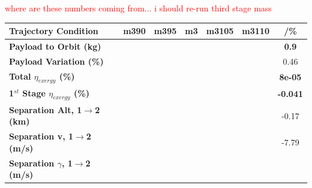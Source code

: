 \textcolor{red}{where are these numbers coming from... i should re-run third stage mass}
\begin{table}[ht]
	\centering
	\begin{tabular}{l c c c c c c} 
		\hline \textbf{Trajectory Condition}
		&m390
		&m395
		&m3
		&m3105
		&m3110
		& /\%
		\\
		\hline \textbf{Payload to Orbit (kg)}
		& \textbf{\PayloadToOrbitmThreeNinetyNoReturn}
		& \textbf{\PayloadToOrbitmThreeNinetyFiveNoReturn}
		& \textbf{\PayloadToOrbitmThreeStandardNoReturn}
		& \textbf{\PayloadToOrbitmThreeOneHundredFiveNoReturn}
		& \textbf{\PayloadToOrbitmThreeOneHundredTenNoReturn}
		&\textbf{0.9}
		\\
		\textbf{Payload Variation (\%)}
		& \PayloadVarmThreeNinetyNoReturn
		& \PayloadVarmThreeNinetyFiveNoReturn
		& \PayloadVarmThreeStandardNoReturn
		& \PayloadVarmThreeOneHundredFiveNoReturn
		& \PayloadVarmThreeOneHundredTenNoReturn
		&0.46
		\\
		\textbf{Total $\eta_{exergy}$ (\%)}
		& \textbf{\totalExergyEffmThreeNinetyNoReturn}
		& \textbf{\totalExergyEffmThreeNinetyFiveNoReturn}
		& \textbf{\totalExergyEffmThreeStandardNoReturn}
		& \textbf{\totalExergyEffmThreeOneHundredFiveNoReturn}
		& \textbf{\totalExergyEffmThreeOneHundredTenNoReturn}
		& \textbf{8e-05}
		\\
		\hline 
		\textbf{1$^{st}$ Stage $\eta_{exergy}$ (\%)}
		& \textbf{\firstExergyEffmThreeNinetyNoReturn}
		& \textbf{\firstExergyEffmThreeNinetyFiveNoReturn}
		& \textbf{\firstExergyEffmThreeStandardNoReturn}
		& \textbf{\firstExergyEffmThreeOneHundredFiveNoReturn}
		& \textbf{\firstExergyEffmThreeOneHundredTenNoReturn}
		& \textbf{-0.041}
		\\
		\textbf{Separation Alt, 1$\rightarrow$2 (km)}
		& \firstsecondSeparationAltmThreeNinetyNoReturn
		& \firstsecondSeparationAltmThreeNinetyFiveNoReturn
		& \firstsecondSeparationAltmThreeStandardNoReturn
		& \firstsecondSeparationAltmThreeOneHundredFiveNoReturn
		& \firstsecondSeparationAltmThreeOneHundredTenNoReturn
		&-0.17
		\\
		\textbf{Separation v, 1$\rightarrow$2 (m/s)}
		& \firstsecondSeparationvmThreeNinetyNoReturn
		& \firstsecondSeparationvmThreeNinetyFiveNoReturn
		& \firstsecondSeparationvmThreeStandardNoReturn
		& \firstsecondSeparationvmThreeOneHundredFiveNoReturn
		& \firstsecondSeparationvmThreeOneHundredTenNoReturn
		&-7.79
		\\
		\textbf{Separation $\gamma$, 1$\rightarrow$2 (m/s)}
		& \firstsecondSeparationgammamThreeNinetyNoReturn

\end{tabular}
\end{table}
